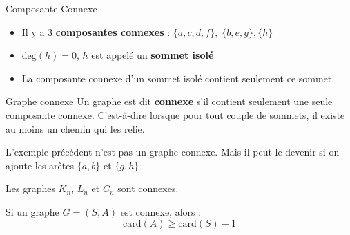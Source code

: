 \begin{Example}{Composante Connexe}{}
\begin{center}
\end{center}
\begin{itemize}
    \item Il y a 3 \textbf{composantes connexes} : $\{a,c,d,f\}, \; \{b,e,g\}, \{h\}$
    \item $\mathrm{deg} (h) =0$, $h$ est appelé un \textbf{sommet isolé}
    \item La composante connexe d'un sommet isolé contient seulement ce sommet.
\end{itemize}
\end{Example}
\begin{Definition}[colbacktitle=red!75!black]{Graphe connexe}{}
Un graphe est dit \textbf{connexe} s'il contient seulement une seule composante connexe. C'est-à-dire lorsque pour tout couple de sommets, il existe au moins un chemin qui les relie.
\end{Definition}

\begin{Example}{}{}
    L'exemple précédent n'est pas un graphe connexe. Mais il peut le devenir si on ajoute les arêtes $\{a,b\}$ et $\{g,h\}$
\end{Example}

\begin{Example}{}{}
Les graphes $K_n$, $L_n$ et $C_n$ sont connexes.
\end{Example}


  \begin{Prop}{}{}
  Si un graphe $G= (S,A)$ est connexe, alors :
  \[
  \mathrm{card} (A) \ge  \mathrm{card} (S) - 1 
  \]

  \end{Prop}

